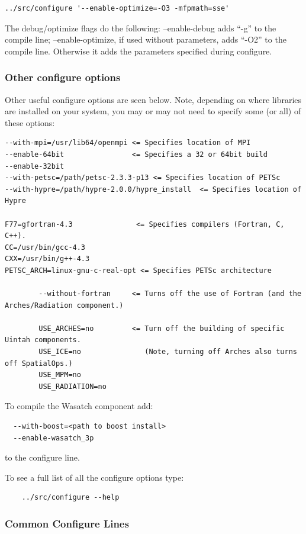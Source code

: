 \documentclass[12pt]{article}
\begin{document}
\begin{verbatim}
../src/configure '--enable-optimize=-O3 -mfpmath=sse' 
\end{verbatim}

The debug/optimize flags do the following:  --enable-debug adds ``-g''
to the compile line; --enable-optimize, if used without parameters,
adds ``-O2'' to the compile line.  Otherwise it adds the parameters
specified during configure.

\subsubsection{Other configure options}

Other useful configure options are seen below.  Note, depending on
where libraries are installed on your system, you may or may not need
to specify some (or all) of these options:

\begin{verbatim}
--with-mpi=/usr/lib64/openmpi <= Specifies location of MPI
--enable-64bit                <= Specifies a 32 or 64bit build
--enable-32bit
--with-petsc=/path/petsc-2.3.3-p13 <= Specifies location of PETSc
--with-hypre=/path/hypre-2.0.0/hypre_install  <= Specifies location of Hypre

F77=gfortran-4.3               <= Specifies compilers (Fortran, C, C++).
CC=/usr/bin/gcc-4.3
CXX=/usr/bin/g++-4.3
PETSC_ARCH=linux-gnu-c-real-opt <= Specifies PETSc architecture

        --without-fortran     <= Turns off the use of Fortran (and the Arches/Radiation component.)

        USE_ARCHES=no         <= Turn off the building of specific Uintah components.
        USE_ICE=no               (Note, turning off Arches also turns off SpatialOps.)
        USE_MPM=no
        USE_RADIATION=no

\end{verbatim}
To compile the Wasatch component add:
\begin{verbatim}
  --with-boost=<path to boost install>
  --enable-wasatch_3p
\end{verbatim}
to the configure line.

To see a full list of all the configure options type:

\begin{verbatim}
    ../src/configure --help
\end{verbatim}

\subsubsection{Common Configure Lines}
\end{document}
